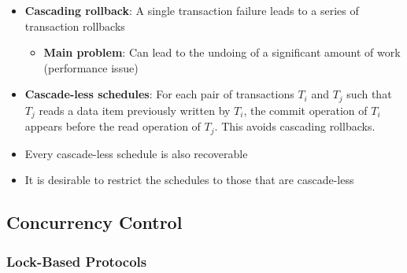 \begin{itemize}[label=\(\rhd\)]
    \item \textbf{Cascading rollback}: A single transaction failure leads to a series of transaction rollbacks 
    \begin{itemize}[label=\(\rhd\)]
        \item \textbf{Main problem}: Can lead to the undoing of a significant amount of work (performance issue)
    \end{itemize}
    \item \textbf{Cascade-less schedules}: For each pair of transactions $T_i$ and $T_j$ such that $T_j$ reads a data item previously written by $T_i$, the commit operation of $T_i$ appears before the read operation of $T_j$. This avoids cascading rollbacks. 
    \item Every cascade-less schedule is also recoverable
    \item It is desirable to restrict the schedules to those that are cascade-less
\end{itemize}

\subsection{Concurrency Control}
\subsubsection{Lock-Based Protocols}


